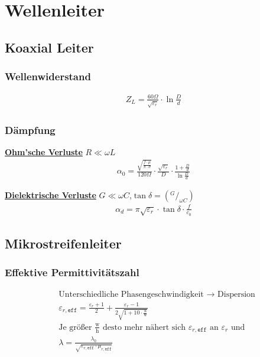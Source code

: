 \section{Wellenleiter}
\subsection{Koaxial Leiter}
\subsubsection{Wellenwiderstand}


\begin{align*}
    Z_L = \frac{60\Omega}{\sqrt{\varepsilon_r}}\cdot \ln{\frac{D}{d}}
\end{align*}

\subsubsection{Dämpfung}
\underline{\textbf{Ohm'sche Verluste}} $R\ll\omega L$
\begin{align*}
    \alpha_0 = \frac{\sqrt{\frac{f\cdot\mu}{\pi\cdot\sigma}}}{120\Omega}\cdot\frac{\sqrt{\varepsilon_r}}{D}\cdot\frac{1+\frac{D}{d}}{\ln \frac{D}{d}}
\end{align*}

\underline{\textbf{Dielektrische Verluste}} $G\ll\omega C$,$\tan\delta= (^G/_{\omega C})$
\begin{align*}
    \alpha_d = \pi\sqrt{\varepsilon_r}\cdot\tan\delta\cdot\frac{f}{c_0}
\end{align*}

\subsection{Mikrostreifenleiter}

\subsubsection{Effektive Permittivitätszahl}
\begin{align*}
     & \text{Unterschiedliche Phasengeschwindigkeit $\rightarrow$ Dispersion}                                                       \\
     & \varepsilon_{r,\texttt{eff}}  = \frac{\varepsilon_r+1}{2}+\frac{\varepsilon_r-1}{2\sqrt{1+10\cdot\frac{\text{h}}{\text{w}}}} \\
     & \text{Je größer $\frac{\text{w}}{\text{h}}$ desto mehr nähert sich $\varepsilon_{r,\texttt{eff}}$ an $\varepsilon_r$ und}    \\
     & \lambda              = \frac{\lambda_0}{\sqrt{\varepsilon_{r,\texttt{eff}}\cdot\mu_{r,\texttt{eff}}}}
\end{align*}
